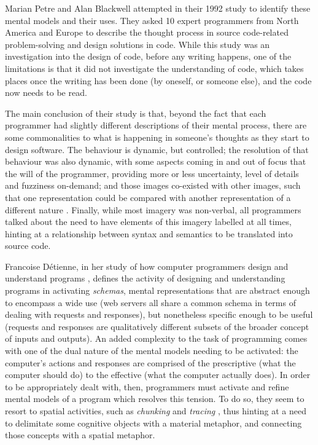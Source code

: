 Marian Petre and Alan Blackwell attempted in their 1992 study to identify these mental models and their uses. They asked 10 expert programmers from North America and Europe to describe the thought process in source code-related problem-solving and design solutions in code. While this study was an investigation into the design of code, before any writing happens, one of the limitations is that it did not investigate the understanding of code, which takes places once the writing has been done (by oneself, or someone else), and the code now needs to be read.

The main conclusion of their study is that, beyond the fact that each programmer had slightly different descriptions of their mental process, there are some commonalities to what is happening in someone's thoughts as they start to design software. The behaviour is dynamic, but controlled; the resolution of that behaviour was also dynamic, with some aspects coming in and out of focus that the will of the programmer, providing more or less uncertainty, level of details and fuzziness on-demand; and those images co-existed with other images, such that one representation could be compared with another representation of a different nature \citep{petre_glimpse_1997}. Finally, while most imagery was non-verbal, all programmers talked about the need to have elements of this imagery labelled at all times, hinting at a relationship between syntax and semantics to be translated into source code.

Francoise Détienne, in her study of how computer programmers design and understand programs \citep{detienne_software_2001}, defines the activity of designing and understanding programs in activating \emph{schemas}, mental representations that are abstract enough to encompass a wide use (web servers all share a common schema in terms of dealing with requests and responses), but nonetheless specific enough to be useful (requests and responses are qualitatively different subsets of the broader concept of inputs and outputs). An added complexity to the task of programming comes with one of the dual nature of the mental models needing to be activated: the computer's actions and responses are comprised of the prescriptive (what the computer should do) to the effective (what the computer actually does). In order to be appropriately dealt with, then, programmers must activate and refine mental models of a program which resolves this tension. To do so, they seem to resort to spatial activities, such as \emph{chunking} and \emph{tracing} \citep{cant_conceptual_1995}, thus hinting at a need to delimitate some cognitive objects with a material metaphor, and connecting those concepts with a spatial metaphor.

